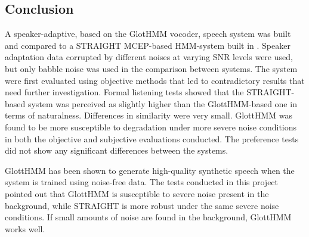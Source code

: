 \subsection{Conclusion}
\label{conclusions_conclusion}
A speaker-adaptive, based on the GlotHMM vocoder, speech system was built and compared to a STRAIGHT MCEP-based HMM-system built in \cite{karhila_jstsp_14}.
%
Speaker adaptation data corrupted by different noises at varying SNR levels were used, but only babble noise was used in the comparison between systems.
%
The system were first evaluated using objective methods that led to contradictory results that need further investigation.
%
Formal listening tests showed that the STRAIGHT-based system was perceived as slightly higher than the GlottHMM-based one in terms of naturalness.
%
Differences in similarity were very small.
%
GlottHMM was found to be more susceptible to degradation under more severe noise conditions in both the objective and subjective evaluations conducted.
%
The preference tests did not show any significant differences between the systems.

GlottHMM has been shown to generate high-quality synthetic speech when the system is trained using noise-free data.
%
The tests conducted in this project pointed out that GlottHMM is susceptible to severe noise present in the background, while STRAIGHT is more robust under the same severe noise conditions.
%
If small amounts of noise are found in the background, GlottHMM works well.